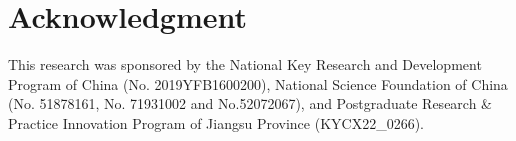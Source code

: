 \documentclass[journal]{IEEEtran}
\begin{document}
\afterpage{\clearpage}


\section*{Acknowledgment}

This research was sponsored by the National Key Research and Development Program of China (No. 2019YFB1600200), National Science Foundation of China (No. 51878161, No. 71931002 and No.52072067), and Postgraduate Research \& Practice Innovation Program of Jiangsu Province (KYCX22\_0266).

% 
% 




\end{document}
